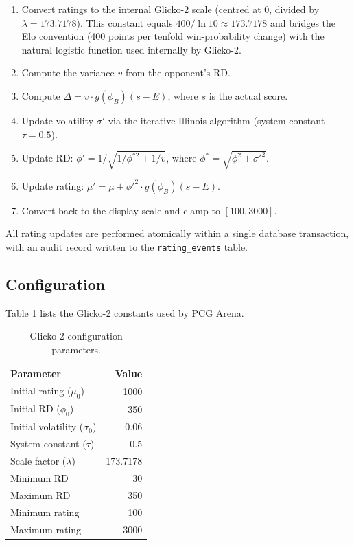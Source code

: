 \documentclass[shortabstract, mgr, english]{iithesis}
\begin{document}
\begin{enumerate}
    \item Convert ratings to the internal Glicko-2 scale (centred at 0, divided by
          $\lambda = 173.7178$).  This constant equals $400 / \ln 10 \approx 173.7178$
          and bridges the Elo convention (400 points per tenfold win-probability change)
          with the natural logistic function used internally by Glicko-2.
    \item Compute the variance $v$ from the opponent's RD.
    \item Compute $\Delta = v \cdot g(\phi_B)(s - E)$, where $s$ is the actual score.
    \item Update volatility $\sigma'$ via the iterative Illinois algorithm
          (system constant $\tau = 0.5$).
    \item Update RD: $\phi' = 1/\sqrt{1/\phi^{*2} + 1/v}$, where
          $\phi^* = \sqrt{\phi^2 + \sigma'^2}$.
    \item Update rating: $\mu' = \mu + \phi'^2 \cdot g(\phi_B)(s - E)$.
    \item Convert back to the display scale and clamp to $[100, 3000]$.
\end{enumerate}

All rating updates are performed atomically within a single database transaction, with
an audit record written to the \texttt{rating\_events} table.

\subsection{Configuration}
\label{subsec:sd-glicko-config}

Table \ref{tab:glicko-params} lists the Glicko-2 constants used by PCG Arena.

\begin{table}[H]
\centering
\begin{tabular}{lr}
\toprule
\textbf{Parameter} & \textbf{Value} \\
\midrule
Initial rating ($\mu_0$)       & 1000 \\
Initial RD ($\phi_0$)          & 350 \\
Initial volatility ($\sigma_0$) & 0.06 \\
System constant ($\tau$)       & 0.5 \\
Scale factor ($\lambda$)       & 173.7178 \\
Minimum RD                     & 30 \\
Maximum RD                     & 350 \\
Minimum rating                 & 100 \\
Maximum rating                 & 3000 \\
\bottomrule
\end{tabular}
\caption{Glicko-2 configuration parameters.}
\label{tab:glicko-params}
\end{table}
\end{document}
